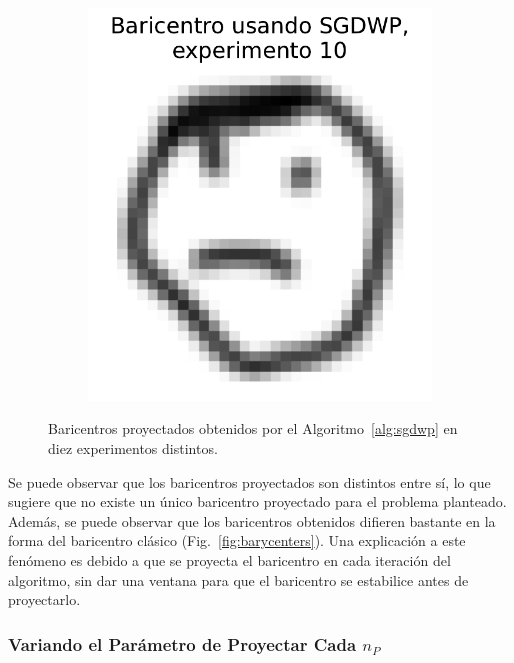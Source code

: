 \begin{figure}[H]
\begin{subfigure}[b]{0.17\textwidth}
        \label{fig:bar-SGDWP-exp-09}
    \end{subfigure}
    \hfill
    \begin{subfigure}[b]{0.17\textwidth}
        \centering
        \includegraphics[width=\textwidth]{img/sgdwp/bar-SGDWP-exp-10.pdf}
        \label{fig:bar-SGDWP-exp-10}
    \end{subfigure}
    \caption{Baricentros proyectados obtenidos por el Algoritmo~\ref{alg:sgdwp} en diez experimentos distintos.}
    \label{fig:bar-SGDWP-exp}
\end{figure}

Se puede observar que los baricentros proyectados son distintos entre sí, lo que sugiere que no existe un único baricentro proyectado para el problema planteado. Además, se puede observar que los baricentros obtenidos difieren bastante en la forma del baricentro clásico (Fig.~\ref{fig:barycenters}). Una explicación a este fenómeno es debido a que se proyecta el baricentro en cada iteración del algoritmo, sin dar una ventana para que el baricentro se estabilice antes de proyectarlo.

\subsubsection{Variando el Parámetro de Proyectar Cada $n_P$}\label{sssec:sgdwp-variar-param}  %

